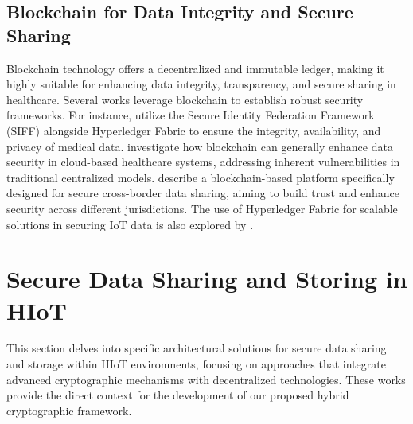 \documentclass[cic,tc,english]{iiufrgs}
\numberwithin{algorithm}{chapter}
\begin{document}
        \subsection{Blockchain for Data Integrity and Secure Sharing}
            Blockchain technology offers a decentralized and immutable ledger, making it highly suitable for enhancing data integrity, transparency, and secure sharing in healthcare. Several works leverage blockchain to establish robust security frameworks. For instance, \citet{Tian2019} utilize the Secure Identity Federation Framework (SIFF) alongside Hyperledger Fabric to ensure the integrity, availability, and privacy of medical data. \citet{Esposito2018} investigate how blockchain can generally enhance data security in cloud-based healthcare systems, addressing inherent vulnerabilities in traditional centralized models. \citet{Rahman2020} describe a blockchain-based platform specifically designed for secure cross-border data sharing, aiming to build trust and enhance security across different jurisdictions. The use of Hyperledger Fabric for scalable solutions in securing IoT data is also explored by \citet{Eghmazi2024}.
    

    \section{Secure Data Sharing and Storing in HIoT}
        \label{sec:securedata}
        This section delves into specific architectural solutions for secure data sharing and storage within HIoT environments, focusing on approaches that integrate advanced cryptographic mechanisms with decentralized technologies. These works provide the direct context for the development of our proposed hybrid cryptographic framework.
\end{document}
